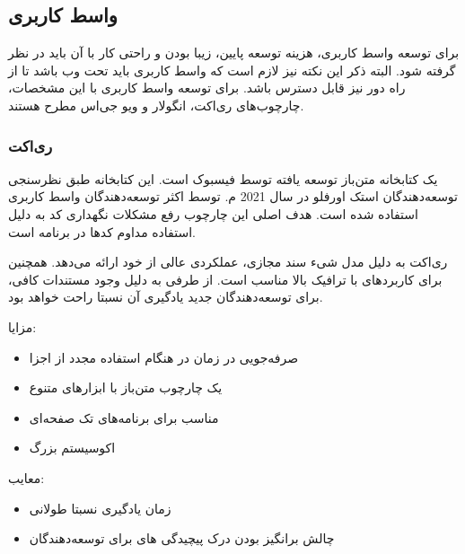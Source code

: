 \subsection{واسط کاربری}

برای توسعه واسط کاربری، هزینه توسعه پایین، زیبا بودن و راحتی کار با آن باید در نظر گرفته شود. البته ذکر این نکته نیز لازم است که واسط کاربری  باید تحت وب باشد تا از راه دور نیز قابل دسترس باشد. برای توسعه واسط کاربری با این مشخصات، چارچوب‌های ری‌اکت، انگولار و ویو جی‌اس مطرح هستند.

\newpage


\subsubsection{ری‌اکت}

یک کتابخانه متن‌باز توسعه یافته توسط فیسبوک است. این کتابخانه طبق نظرسنجی توسعه‌دهندگان استک اورفلو در سال 2021 م. توسط اکثر توسعه‌دهندگان واسط کاربری استفاده شده است\cite{stackoverflow_stack_nodate}. هدف اصلی این چارچوب رفع مشکلات نگهداری کد به دلیل استفاده مداوم کدها در برنامه است.


ری‌اکت به دلیل مدل شیء سند مجازی، عملکردی عالی از خود ارائه می‌دهد. همچنین برای کاربردهای با ترافیک بالا مناسب است. از طرفی به دلیل وجود مستندات کافی، برای توسعه‌دهندگان جدید یادگیری آن نسبتا راحت خواهد بود\cite{technologies_what_2021}.



مزایا:
\begin{itemize}
    \item صرفه‌جویی در زمان در هنگام استفاده مجدد از اجزا
    \item یک چارچوب متن‌باز با ابزارهای متنوع
    \item مناسب برای برنامه‌های تک صفحه‌ای
    \item اکوسیستم بزرگ
\end{itemize}

معایب:

\begin{itemize}
    \item زمان یادگیری نسبتا طولانی
    \item چالش برانگیز بودن درک پیچیدگی های  برای توسعه‌دهندگان
\end{itemize}

\newpage

